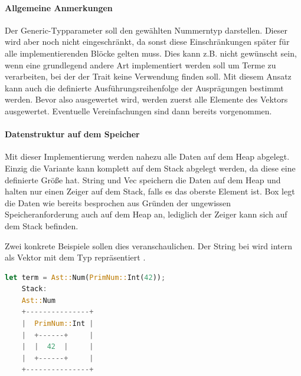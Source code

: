 \documentclass[11pt,a4paper, ngerman]{article}
\begin{document}
\paragraph{Allgemeine Anmerkungen} Der Generic-Typparameter  soll den gewählten Nummerntyp darstellen. Dieser wird aber noch nicht eingeschränkt, da sonst diese Einschränkungen später für alle implementierenden Blöcke gelten muss. Dies kann z.B. nicht gewünscht sein, wenn eine grundlegend andere Art implementiert werden soll um Terme zu verarbeiten, bei der der Trait  keine Verwendung finden soll. Mit diesem Ansatz kann auch die definierte Ausführungsreihenfolge der Ausprägungen bestimmt werden. Bevor also  ausgewertet wird, werden zuerst alle Elemente des Vektors ausgewertet. Eventuelle Vereinfachungen sind dann bereits vorgenommen.

\paragraph{Datenstruktur auf dem Speicher} Mit dieser Implementierung werden nahezu alle Daten auf dem Heap abgelegt. Einzig die Variante  kann komplett auf dem Stack abgelegt werden, da diese eine definierte Größe hat. String und Vec speichern die Daten auf dem Heap und halten nur einen Zeiger auf dem Stack, falls es das oberste Element ist. Box legt die Daten wie bereits besprochen aus Gründen der ungewissen Speicheranforderung auch auf dem Heap an, lediglich der Zeiger kann sich auf dem Stack befinden.

Zwei konkrete Beispiele sollen dies veranschaulichen. Der String bei  wird intern als Vektor mit dem Typ  repräsentiert \cite{StringSrc}.
\begin{lstlisting}[language=rust, caption={Term 1 Stack und Heap}]
    let term = Ast::Num(PrimNum::Int(42));
    Stack:
    Ast::Num
    +---------------+
    |  PrimNum::Int |
    |  +------+     |
    |  |  42  |     |
    |  +------+     |
    +---------------+
\end{lstlisting}
\end{document}
